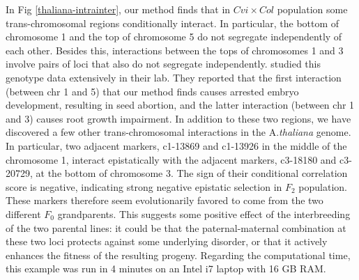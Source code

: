 In Fig \ref{thaliana-intrainter}, our method finds that in $Cvi \times Col$ population some trans-chromosomal regions conditionally interact. In particular, the bottom of chromosome 1 and the top of chromosome 5 do not segregate independently of each other. Besides this, interactions between the tops of chromosomes 1 and 3 involve pairs of loci that also do not segregate independently. \cite{bikard2009divergent} studied this genotype data extensively in their lab. They reported that the first interaction (between chr 1 and 5) that our method finds causes arrested embryo development, resulting in seed abortion, and the latter interaction (between chr 1 and 3) causes root growth impairment. In addition to these two regions, we have discovered a few other trans-chromosomal interactions in the A.\emph{thaliana} genome. In particular, two adjacent markers, c1-13869 and c1-13926 in the middle of the chromosome 1, interact epistatically with the adjacent markers, c3-18180 and c3-20729, at the bottom of chromosome 3. The sign of their conditional correlation score is negative, indicating strong negative epistatic selection in $F_2$ population. These markers therefore seem evolutionarily favored to come from the two different $F_0$ grandparents. This suggests some positive effect of the interbreeding of the two parental lines: it could be that the paternal-maternal combination at these two loci protects against some underlying disorder, or that it actively enhances the fitness of the resulting progeny. Regarding the computational time, this example was run in 4 minutes on an Intel i7 laptop with 16 GB RAM.
